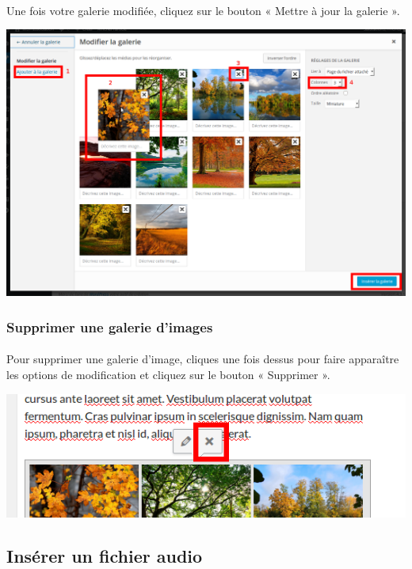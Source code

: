 \documentclass[10pt,a4paper]{article}
\begin{document}
\paragraph{}Une fois votre galerie modifiée, cliquez sur le bouton « Mettre à jour la galerie ».
\begin{center}
\includegraphics[scale=0.25]{img/0116.png}
\end{center}
\newpage
\subsubsection{Supprimer une galerie d'images}
\paragraph{}Pour supprimer une galerie d'image, cliques une fois dessus pour faire apparaître les options de modification et cliquez sur le bouton « Supprimer ».
\begin{center}
\includegraphics[scale=0.3]{img/0119.png}
\end{center}
\newpage
\subsection{Insérer un fichier audio}
\end{document}
